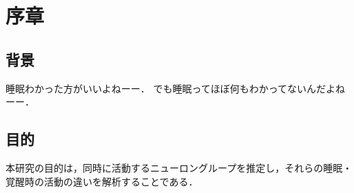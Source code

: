\chapter{序章}
\section{背景}
睡眠わかった方がいいよねーー．
でも睡眠ってほぼ何もわかってないんだよねーー．

\section{目的}
本研究の目的は，同時に活動するニューロングループを推定し，それらの睡眠・覚醒時の活動の違いを解析することである．

